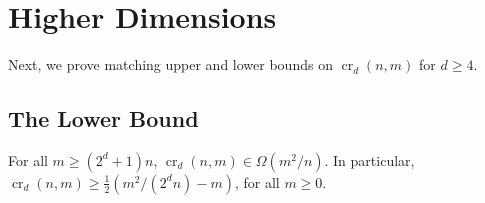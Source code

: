 \documentclass{patmorin}
\DeclareMathOperator{\crs}{cr}
\begin{document}
\section{Higher Dimensions}

Next, we prove matching upper and lower bounds on $\crs_d(n,m)$ for
$d\ge 4$.

\subsection{The Lower Bound}

\begin{thm}
  For all $m\ge (2^d+1)n$, $\crs_d(n,m)\in\Omega(m^2/n)$.  In particular,
  $\crs_d(n,m)\ge \frac{1}{2}(m^2/(2^dn) - m)$, for all $m\ge 0$.
\end{thm}
\end{document}
